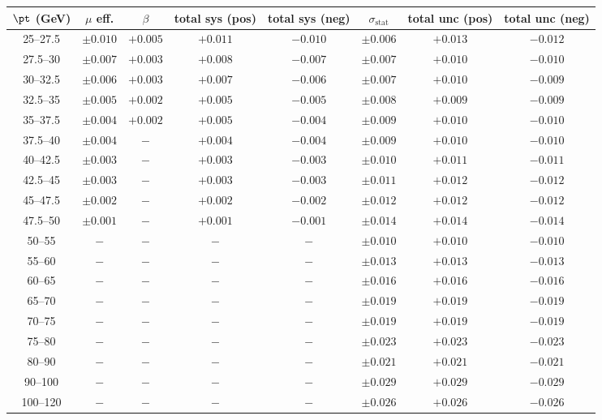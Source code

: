 \begin{tabular}{c|cc|cc|c|cc}
$\pt$ (GeV)  & $\mu$ eff. & $\beta$ & total sys (pos) & total sys (neg) & $\sigma_{\text{stat}}$ & total unc (pos) & total unc (neg) \\
\hline
25--27.5 & $\pm0.010$ & $+0.005$ & $+0.011$ & $-0.010$ & $\pm0.006$ & $+0.013$ & $-0.012$\\
27.5--30 & $\pm0.007$ & $+0.003$ & $+0.008$ & $-0.007$ & $\pm0.007$ & $+0.010$ & $-0.010$\\
30--32.5 & $\pm0.006$ & $+0.003$ & $+0.007$ & $-0.006$ & $\pm0.007$ & $+0.010$ & $-0.009$\\
32.5--35 & $\pm0.005$ & $+0.002$ & $+0.005$ & $-0.005$ & $\pm0.008$ & $+0.009$ & $-0.009$\\
35--37.5 & $\pm0.004$ & $+0.002$ & $+0.005$ & $-0.004$ & $\pm0.009$ & $+0.010$ & $-0.010$\\
37.5--40 & $\pm0.004$ & $-$ & $+0.004$ & $-0.004$ & $\pm0.009$ & $+0.010$ & $-0.010$\\
40--42.5 & $\pm0.003$ & $-$ & $+0.003$ & $-0.003$ & $\pm0.010$ & $+0.011$ & $-0.011$\\
42.5--45 & $\pm0.003$ & $-$ & $+0.003$ & $-0.003$ & $\pm0.011$ & $+0.012$ & $-0.012$\\
45--47.5 & $\pm0.002$ & $-$ & $+0.002$ & $-0.002$ & $\pm0.012$ & $+0.012$ & $-0.012$\\
47.5--50 & $\pm0.001$ & $-$ & $+0.001$ & $-0.001$ & $\pm0.014$ & $+0.014$ & $-0.014$\\
50--55 & $-$ & $-$ & $-$ & $-$ & $\pm0.010$ & $+0.010$ & $-0.010$\\
55--60 & $-$ & $-$ & $-$ & $-$ & $\pm0.013$ & $+0.013$ & $-0.013$\\
60--65 & $-$ & $-$ & $-$ & $-$ & $\pm0.016$ & $+0.016$ & $-0.016$\\
65--70 & $-$ & $-$ & $-$ & $-$ & $\pm0.019$ & $+0.019$ & $-0.019$\\
70--75 & $-$ & $-$ & $-$ & $-$ & $\pm0.019$ & $+0.019$ & $-0.019$\\
75--80 & $-$ & $-$ & $-$ & $-$ & $\pm0.023$ & $+0.023$ & $-0.023$\\
80--90 & $-$ & $-$ & $-$ & $-$ & $\pm0.021$ & $+0.021$ & $-0.021$\\
90--100 & $-$ & $-$ & $-$ & $-$ & $\pm0.029$ & $+0.029$ & $-0.029$\\
100--120 & $-$ & $-$ & $-$ & $-$ & $\pm0.026$ & $+0.026$ & $-0.026$\\
\end{tabular}
